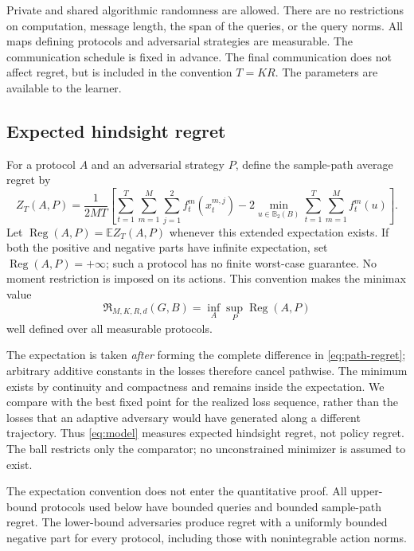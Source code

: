\documentclass[11pt,a4paper]{article}
\numberwithin{equation}{section}
\theoremstyle{remark}
\newcommand{\E}{\mathbb E}
\newcommand{\calR}{\mathfrak R}
\newcommand{\B}{\mathbb B_2}
\begin{document}
Private and shared algorithmic randomness are allowed. There are no
restrictions on computation, message length, the span of the queries,
or the query norms. All maps defining protocols and adversarial strategies
are measurable. The
communication schedule is fixed in advance. The final communication
does not affect regret, but is included in the convention $T=KR$.
The parameters are available to the learner.

\subsection{Expected hindsight regret}

For a protocol $A$ and an adversarial strategy $P$, define the sample-path
average regret by
\begin{equation}
 Z_T(A,P)=\frac1{2MT}\left[
 \sum_{t=1}^T\sum_{m=1}^M\sum_{j=1}^2 f_t^m(x_t^{m,j})
 -2\min_{u\in\B(B)}\sum_{t=1}^T\sum_{m=1}^M f_t^m(u)
 \right].
 \label{eq:path-regret}
\end{equation}
Let $\operatorname{Reg}(A,P)=\E Z_T(A,P)$ whenever this extended
expectation exists. If both the positive and negative parts have
infinite expectation, set $\operatorname{Reg}(A,P)=+\infty$;
such a protocol has no finite worst-case guarantee. No moment restriction is imposed
on its actions. This convention makes the minimax value
\begin{equation}
 \calR_{M,K,R,d}(G,B)=\inf_A\sup_P\operatorname{Reg}(A,P)
 \label{eq:model}
\end{equation}
well defined over all measurable protocols.

The expectation is taken \emph{after} forming the complete difference
in \eqref{eq:path-regret}; arbitrary additive constants in the losses
therefore cancel pathwise. The minimum exists by continuity and
compactness and remains inside the expectation. We compare with the
best fixed point for the realized loss sequence, rather than the losses
that an adaptive adversary would have generated along a different
trajectory. Thus \eqref{eq:model} measures expected hindsight regret,
not policy regret. The ball restricts only the comparator; no
unconstrained minimizer is assumed to exist.

The expectation convention does not enter the quantitative proof. All
upper-bound protocols used below have bounded queries and bounded
sample-path regret. The lower-bound adversaries produce regret with a
uniformly bounded negative part for every protocol, including those
with nonintegrable action norms.
\end{document}
